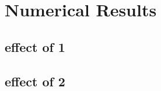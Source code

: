 \section{Numerical Results} %
\label{sec:numerical_results}

\subsection{effect of 1} %
\label{sub:effect_of_1}


\subsection{effect of 2} %
\label{sub:effect_of_2}



